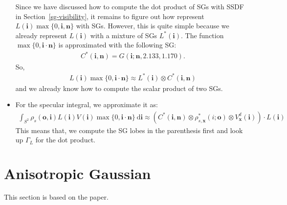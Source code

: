 \documentclass[10pt]{article}
\newcommand{\dee}{\mathrm{d}}
\newcommand{\ve}[1]{\mathbf{#1}}
\begin{document}
\begin{itemize}
    Since we have discussed how to compute the dot product of SGs with SSDF in Section~\ref{sg-visibility}, it remains to figure out how represent $L(\ve{i}) \max\{0,\ve{i},\ve{n} \}$ with SGs.  However, this is quite simple because we already represent $L(\ve{i})$ with a mixture of SGs $L^*(\ve{i})$.  The function $\max\{ 0, \ve{i} \cdot \ve{n} \}$ is approximated with the following SG:
    \begin{align*}
      C^*(\ve{i},\ve{n}) = G(\ve{i}; \ve{n}, 2.133, 1.170).
    \end{align*}
    So,
    \begin{align*}
      L(\ve{i}) \max\{0,\ve{i}\cdot\ve{n} \} \approx L^*(\ve{i}) \otimes C^*(\ve{i},\ve{n})
    \end{align*}
    and we already know how to compute the scalar product of two SGs.

    \item For the specular integral, we approximate it as:
    \begin{align*}
      \int_{S^2} \rho_s(\ve{o}, \ve{i}) L(\ve{i}) V(\ve{i}) \max\{0, \ve{i} \cdot \ve{n} \}\ \dee\ve{i}
      \approx ( C^*(\ve{i},\ve{n}) \otimes \rho^*_{s,\ve{x}}(i;\ve{o}) \otimes V^d_{\ve{x}}(\ve{i}) ) \cdot L(\ve{i})
    \end{align*}
    This means that, we compute the SG lobes in the parenthesis first and look up $\Gamma_L$ for the dot product.

  \end{itemize}

  \section{Anisotropic Gaussian}

  This section is based on the \cite{Xu:2013} paper.
\end{document}
